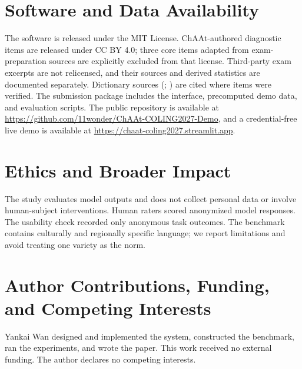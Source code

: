 \documentclass[11pt]{article}
\begin{document}
\section*{Software and Data Availability}

The software is released under the MIT License. ChAAt-authored diagnostic items are released under CC BY 4.0; three core items adapted from exam-preparation sources are explicitly excluded from that license. Third-party exam excerpts are not relicensed, and their sources and derived statistics are documented separately. Dictionary sources (\citealp{zdic}; \citealp{wordshk}) are cited where items were verified. The submission package includes the interface, precomputed demo data, and evaluation scripts. The public repository is available at \url{https://github.com/11wonder/ChAAt-COLING2027-Demo}, and a credential-free live demo is available at \url{https://chaat-coling2027.streamlit.app}.

\section*{Ethics and Broader Impact}

The study evaluates model outputs and does not collect personal data or involve human-subject interventions. Human raters scored anonymized model responses. The usability check recorded only anonymous task outcomes. The benchmark contains culturally and regionally specific language; we report limitations and avoid treating one variety as the norm.

\section*{Author Contributions, Funding, and Competing Interests}

Yankai Wan designed and implemented the system, constructed the benchmark, ran the experiments, and wrote the paper. This work received no external funding. The author declares no competing interests.


\end{document}

